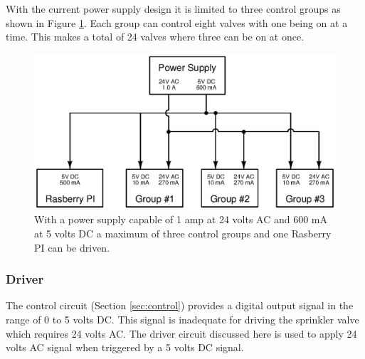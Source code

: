 \documentclass{article}
\begin{document}
With the current power supply design it is limited to three
control groups as shown in Figure \ref{fig:expansion_current}.
Each group can control eight valves with one being on at a time.
This makes a total of 24 valves where three can be on at once.

\begin{figure}[hbp]
\centering
\includegraphics[angle=0,scale=0.80]{xcircuit/expansion_current}
\caption{With a power supply capable of 1 amp at 24 volts AC and
600 mA at 5 volts DC a maximum of three control groups and one
Rasberry PI can be driven.}\label{fig:expansion_current}
\end{figure}


\FloatBarrier
\subsubsection{Driver}
\label{sec:driver}

The control circuit (Section \ref{sec:control}) provides a digital
output signal in the range of 0 to 5 volts DC.
This signal is inadequate for driving the sprinkler valve which
requires 24 volts AC.
The driver circuit discussed here is used to apply 24 volts AC
signal when triggered by a 5 volts DC signal.
\end{document}
